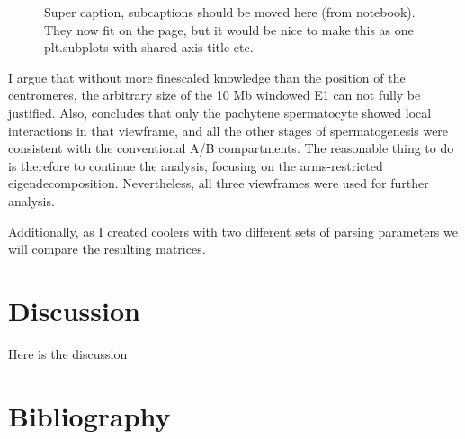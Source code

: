 \documentclass[
  11pt,
  a4paper,
]{scrbook}
\begin{document}
\begin{figure}[H]
\begin{minipage}{0.48\linewidth}
{}


\end{minipage}%

\caption{\label{fig-e1-matrix-full-arms-10mb-round-spermatid}Super
caption, subcaptions should be moved here (from notebook). They now fit
on the page, but it would be nice to make this as one plt.subplots with
shared axis title etc.}

\end{figure}%

I argue that without more finescaled knowledge than the position of the
centromeres, the arbitrary size of the 10 Mb windowed E1 can not fully
be justified. Also, \citet{wang_reprogramming_2019} concludes that only
the pachytene spermatocyte showed local interactions in that viewframe,
and all the other stages of spermatogenesis were consistent with the
conventional A/B compartments. The reasonable thing to do is therefore
to continue the analysis, focusing on the arms-restricted
eigendecomposition. Nevertheless, all three viewframes were used for
further analysis.

Additionally, as I created coolers with two different sets of parsing
parameters we will compare the resulting matrices.

\newpage{}

\chapter{Discussion}\label{discussion}

Here is the discussion

\newpage{}

\chapter*{Bibliography}\label{bibliography}

\begingroup
\raggedright

\renewcommand{\bibsection}{}


\endgroup


\backmatter
\end{document}

